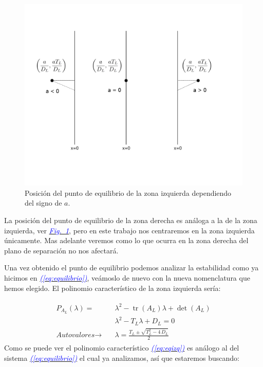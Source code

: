 \documentclass[12pt,a4paper]{report} %
\newcommand{\fref}[1]{\hyperref[#1]{\textcolor{blue}{\textit{Fig.~\ref*{#1}}}}}
\newcommand{\eref}[1]{\hyperref[#1]{\textcolor{blue}{\textit{(\ref*{#1})}}}}
\newcommand{\tr}{\operatorname{\textrm{tr}}}
\begin{document}
		\begin{figure}[h]
			\centering
			\includegraphics[width=1\textwidth]{punto.jpg}
			\caption{Posición del punto de equilibrio de la zona izquierda dependiendo del signo de $a$.}
			\label{fig:punto}
		\end{figure}\smallskip
		
		La posición del punto de equilibrio de la zona derecha es análoga a la de la zona izquierda, ver \fref{fig:punto}, pero en este trabajo nos centraremos en la zona izquierda únicamente. Mas adelante veremos como lo que ocurra en la zona derecha del plano de separación no nos afectará.
		
		\vspace{0.5cm} Una vez obtenido el punto de equilibrio podemos analizar la estabilidad como ya hicimos en \eref{eq:equilibrio}, veámoslo de nuevo con la nueva nomenclatura que hemos elegido. El polinomio característico de la zona izquierda sería:
		
		\begin{eqnarray}
			\label{eq:eqizq}
			\begin{aligned}
				P_{A_L}(\lambda)=&\lambda^2-\tr(A_L)\lambda+\det(A_L) \\[1mm]
				&\lambda^2-T_L\lambda+D_L=0 \\[2mm]
				\textit{Autovalores}\rightarrow \quad &\lambda=\frac{T_L\pm \sqrt{T_L^2-4\,D_L}}{2}
			\end{aligned}
		\end{eqnarray}\smallskip
		\newpage
		Como se puede ver el polinomio característico \eref{eq:eqizq} es análogo al del sistema \eref{eq:equilibrio} el cual ya analizamos, así que estaremos buscando:
		
\end{document}
